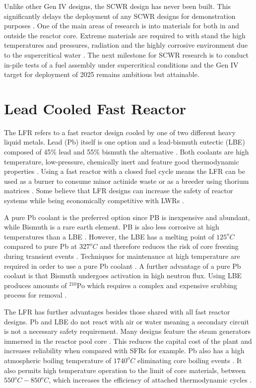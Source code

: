 \documentclass[journal]{IEEEtran}
\begin{document}
Unlike other Gen IV designs, the SCWR design has never been built.
This significantly delays the deployment of any SCWR designs for demonstration purposes \cite{GenIVForum}.
One of the main areas of research is into materials for both in and outside the reactor core.
Extreme materials are required to with stand the high temperatures and pressures, radiation and the highly corrosive environment due to the supercritical water \cite{GenIVForum}.
The next milestone for SCWR research is to conduct in-pile tests of a fuel assembly under supercritical conditions \cite{GenIVForum} and the Gen IV target for deployment of 2025 remains ambitious but attainable.

\section{Lead Cooled Fast Reactor}
The LFR refers to a fast reactor design cooled by one of two different heavy liquid metals. 
Lead (Pb) itself is one option and a lead-bismuth eutectic (LBE) composed of 45\% lead and 55\% bismuth the alternative \cite{Int2012}.
Both coolants are high temperature, low-pressure, chemically inert and feature good thermodynamic properties \cite{GenIVForum}.
Using a fast reactor with a closed fuel cycle means the LFR can be used as a burner to consume minor actinide waste or as a breeder using thorium matrices \cite{GenIVForum}.
Some believe that LFR designs can increase the safety of reactor systems while being economically competitive with LWRs \cite{Int2012}.

A pure Pb coolant is the preferred option since PB is inexpensive and abundant, while Bismuth is a rare earth element.
PB is also less corrosive at high temperatures than a LBE \cite{Locatelli2013}.
However, the LBE has a melting point of $125^{o}C$ compared to pure Pb at $327^{o}C$ and therefore reduces the risk of core freezing during transient events \cite{Locatelli2013}.
Techniques for maintenance at high temperature are required in order to use a pure Pb coolant \cite{Int2013}.
A further advantage of a pure Pb coolant is that Bismuth undergoes activation in high neutron flux.
Using LBE produces amounts of $^{210}$Po which requires a complex and expensive srubbing process for removal \cite{Int2012}.

The LFR has further advantages besides those shared with all fast reactor designs.
Pb and LBE do not react with air or water meaning a secondary circuit is not a necessary safety requirement.
Many designs feature the steam generators immersed in the reactor pool core \cite{GenIVRoadmap}.
This reduces the capital cost of the plant and increases reliability when compared with SFRs for example.
Pb also has a high atmospheric boiling temperature of $1740^{o}C$ eliminating core boiling events \cite{Sakamoto2013194}.
It also permits high temperature operation to the limit of core materials, between $550^{o}C - 850^{o}C$, which increases the efficiency of attached thermodynamic cycles \cite{Marques2010a} .
\end{document}
